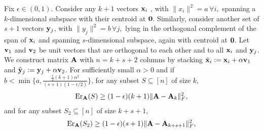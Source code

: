 \documentclass{article}
\begin{document}
\begin{lemma}\label{l:lowerbounddouble}
	Fix $\epsilon\in(0,1)$.  Consider any $k+1$ vectors $\mathbf x_i$ ,
        with $\|x_i\|^2=a \,\forall i,$ spanning a 
	$k$-dimensional subspace with their centroid at $\mathbf 0$. Similarly, consider another set of $s+1$ vectors $\mathbf y_j$, with $\|y_j\|^2=b
        \,\forall j,$ lying in the orthogonal complement of the span
        of $\mathbf x_i$ and spanning $s$-dimensional subspace, again with
        centroid at $\mathbf 0$. 
	Let $\mathbf v_1$ and $\mathbf v_2$
	be unit vectors that are orthogonal to each other and to all $\mathbf x_i$ and $\mathbf y_j$.  We construct
	matrix $\mathbf A$ with $n=k+s+2$ columns by stacking
	$\tilde{\mathbf x}_i:=\mathbf x_i + \alpha \mathbf v_1$ and $\tilde {\mathbf y}_j
	:=\mathbf y_j+\alpha \mathbf v_2$. For sufficiently small
	$\alpha>0$ and if $b < \min\{a, \frac{ \frac{\epsilon}{2} (k+1) \alpha^2}{(s+1) (1-\epsilon/2)} \} $, for any subset $S\subseteq[n]$ of size $k$,
	\begin{align*}
	\mathrm{Er}_{\mathbf A}(S)\geq (1-\epsilon)(k+1) \| \mathbf A -\mathbf A_{k}\|^2_F,
	\end{align*}
	and for any subset $S_2\subseteq[n]$ of size $k+s+1$,
		\begin{align*}
	\mathrm{Er}_{\mathbf A}(S_2)\geq (1-\epsilon)(s+1) \| \mathbf A -\mathbf A_{k+s+1}\|^2_F,
	\end{align*}
\end{lemma}
\end{document}
